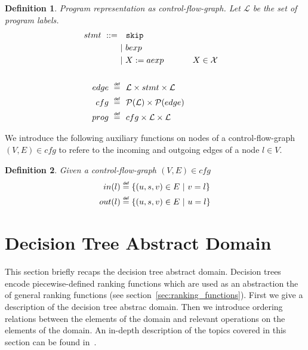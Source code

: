 \documentclass[11pt,a4paper,titlepage]{article}
\newtheorem{definition}{Definition}[section]
\newcommand\eqdef{\mathrel{\overset{\makebox[0pt]{\mbox{\normalfont\tiny\sffamily def}}}{=}}}
\begin{document}
\begin{definition}\label{def:control_flow_graph}
    Program representation as control-flow-graph. 
    Let $\mathcal{L}$ be the set of program labels.
    \begin{align*}
        \setlength{\jot}{15pt}
        stmt \ ::= \ & \ \ \mathtt{skip} \\
        &| \ bexp \\
        &| \ X := aexp  && X \in \mathcal{X} \\
        \\
        edge \ \eqdef & \ \ \mathcal{L} \times stmt \times \mathcal{L}\\
        cfg \ \eqdef & \ \ \mathcal{P}(\mathcal{L}) \times \mathcal{P}(edge)\\
        prog \ \eqdef & \ \ cfg \times \mathcal{L} \times \mathcal{L}
    \end{align*}
\end{definition}

We introduce the following auxiliary functions on nodes of a control-flow-graph $(V, E) \in cfg$ 
to refere to the incoming and outgoing edges of a node $l \in V$.

\begin{definition}\label{def:cfg_in}
    Given a control-flow-graph $(V, E) \in cfg$ 
    \begin{align*}
        in(l) &\eqdef \{(u, s, v) \in E \ | \ v = l \}\\
        out(l) &\eqdef \{(u, s, v) \in E \ | \ u = l \}\\
    \end{align*}
\end{definition}


\section{Decision Tree Abstract Domain}\label{sec:decision_tree_abstract_domain}

This section briefly recaps the decision tree abstract domain. 
Decision trees encode piecewise-defined ranking functions which are used as an abstraction 
the of general ranking functions (see section~\ref{sec:ranking_functions}). 
First we give a description of the decision tree abstrac domain. 
Then we introduce ordering relations between the elements of the domain and relevant operations on the elements of the domain. 
An in-depth description of the topics covered in this section can be found in~\cite{UrbanPhd}.\\
\end{document}
